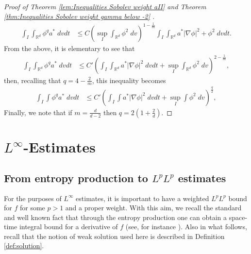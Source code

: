 \documentclass[12pt,american]{amsart}
\numberwithin{equation}{section}
\theoremstyle{plain}
\theoremstyle{definition}                  %
\def\astar{{a^*}}
\begin{document}
\begin{proof}[Proof of Theorem \ref{lem:Inequalities Sobolev weight aII} and Theorem \ref{thm:Inequalities Sobolev weight gamma below -2} ]
   \begin{align*}
    \int_{I}\int_{\mathbb{R}^d}\phi^q \astar \;dvdt & \leq C \left(\sup \limits_{I} \int_{\mathbb{R}^d} \phi^{2}\;dv \right )^{1-\frac{1}{m}}  \int_{I}\int_{\mathbb{R}^d}\astar |\nabla \phi|^2 +\phi^2\;dvdt.
   \end{align*}	
   From the above, it is elementary to see that
   \begin{align*}	
    \int_{I}\int_{\mathbb{R}^d}\phi^q \astar \;dvdt  & \leq C'\left (  \int_{I}\int_{\mathbb{R}^d}\astar |\nabla \phi|^2\;dvdt +\sup \limits_{I}\int_{\mathbb{R}^d}\phi^2\;dv\right )^{2-\frac{1}{m}},
    \end{align*}
    then, recalling that $q = 4-\frac{2}{m}$, this inequality becomes
    \begin{align*}
    \int_{I}  \int\phi^q \astar \;dvdt & \leq C'\left ( \int_{I} \int \astar |\nabla \phi|^2 \;dvdt + \sup \limits_{I} \int \phi^{2}\;dv \right )^{\frac{q}{2}},
    \end{align*}  	
    Finally, we note that if $m=\frac{d}{d-2}$ then $q=2\left (1+\frac{2}{d}\right )$.	
  \end{proof}



\section{$L^\infty$-Estimates}\label{section: Regularization in L infinity}

  \subsection{From entropy production to $L^pL^p$ estimates}
  
  For the purposes of $L^\infty$ estimates, it is important to have a weighted $L^pL^p$ bound for $f$ for some $p>1$ and a proper weight. With this aim, we recall the standard and well known fact that through the entropy production one can obtain a space-time integral bound for a derivative of $f$ (see, for instance \cite{Desvillettes14}). Also in what follows, recall that the notion of weak solution used here is described in Definition \ref{def:solution}.
  
\end{document}
